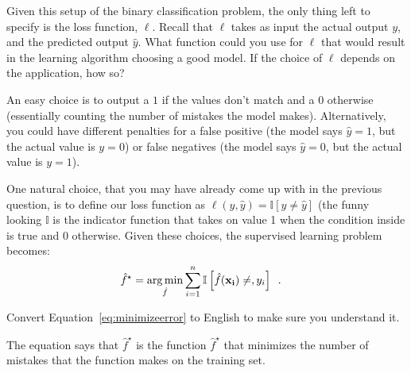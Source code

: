 \documentclass[assignment03_Solutions]{subfiles}
\begin{document}
\begin{exercise}[(10 minutes)]
\bes
\item Given this setup of the binary classification problem, the only thing left to specify is the loss function, $\ell$.  Recall that $\ell$ takes as input the actual output $y$, and the predicted output $\hat{y}$.  What function could you use for $\ell$ that would result in the learning algorithm choosing a good model.  If the choice of $\ell$ depends on the application, how so?

\begin{boxedsolution}
An easy choice is to output a $1$ if the values don't match and a $0$ otherwise (essentially counting the number of mistakes the model makes).  Alternatively, you could have different penalties for a false positive (the model says $\hat{y} = 1$, but the actual value is $y = 0$) or false negatives (the model says $\hat{y} = 0$, but the actual value is $y = 1$). 
\end{boxedsolution}

\item \label{ex:minmistakes}
One natural choice, that you may have already come up with in the previous question, is to define our loss function as $\ell(y, \hat{y}) = \mathbb{I}[y \neq \hat{y}]$ (the funny looking $\mathbb{I}$ is the indicator function that takes on value 1 when the condition inside is true and 0 otherwise.  Given these choices, the supervised learning problem becomes:
\begin{align}
\hat{f}^\star &= \operatorname*{arg\,min}_{\hat{f}} \sum_{i=1}^n \mathbb{I} \left [  \hat{f}(\mathbf{x_i}) \neq, y_i\right ] \enspace . \label{eq:minimizeerror}
\end{align}

Convert Equation~\ref{eq:minimizeerror} to English to make sure you understand it.
\begin{boxedsolution}
The equation says that $\hat{f}^\star$ is the function $\hat{f}^\star$ that minimizes the number of mistakes that the function makes on the training set.
\end{boxedsolution}

\ees

\end{exercise}
\end{document}
